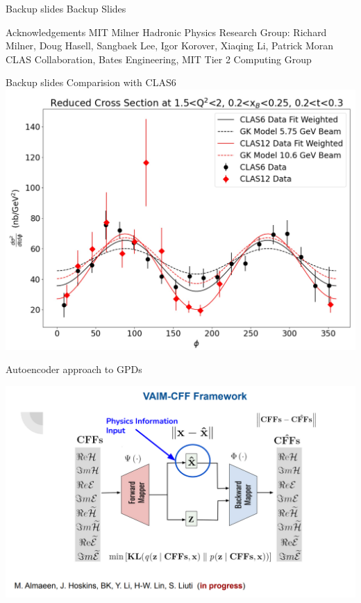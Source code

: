 \documentclass[aspectratio=169]{beamer}
\begin{document}
\begin{frame}{Backup slides}
Backup Slides

\end{frame}


\begin{frame}{Acknowledgements}
MIT Milner Hadronic Physics Research Group: Richard Milner, Doug Hasell, Sangbaek Lee, Igor Korover, Xiaqing Li, Patrick Moran\\
CLAS Collaboration, Bates Engineering, MIT Tier 2 Computing Group
    
\end{frame}



\begin{frame}{Backup slides}
\centering
Comparision with CLAS6\\

    \includegraphics[scale=0.2832]{DNP/comp_c12_gk_c6.jpg}\\
\end{frame}



\begin{frame}{Autoencoder approach to GPDs}

  \includegraphics[scale=0.52832]{janres/vain1.png}
\end{frame}
\end{document}

